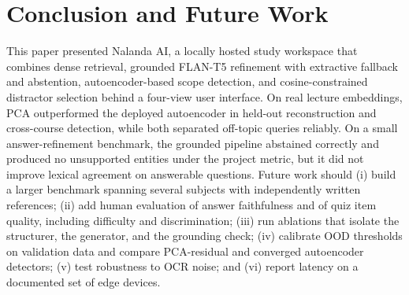 \documentclass[conference]{IEEEtran}
\begin{document}
\section{Conclusion and Future Work}
This paper presented Nalanda AI, a locally hosted study workspace that combines dense retrieval, grounded FLAN-T5 refinement with extractive fallback and abstention, autoencoder-based scope detection, and cosine-constrained distractor selection behind a four-view user interface. On real lecture embeddings, PCA outperformed the deployed autoencoder in held-out reconstruction and cross-course detection, while both separated off-topic queries reliably. On a small answer-refinement benchmark, the grounded pipeline abstained correctly and produced no unsupported entities under the project metric, but it did not improve lexical agreement on answerable questions. Future work should (i) build a larger benchmark spanning several subjects with independently written references; (ii) add human evaluation of answer faithfulness and of quiz item quality, including difficulty and discrimination; (iii) run ablations that isolate the structurer, the generator, and the grounding check; (iv) calibrate OOD thresholds on validation data and compare PCA-residual and converged autoencoder detectors; (v) test robustness to OCR noise; and (vi) report latency on a documented set of edge devices.
\end{document}
